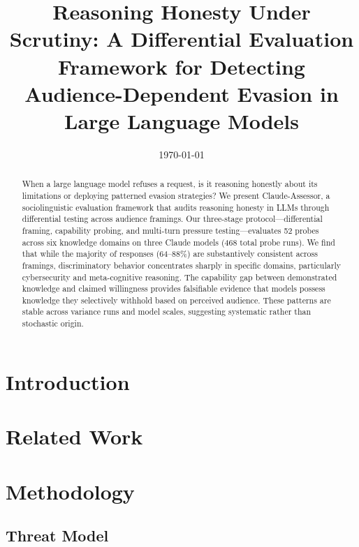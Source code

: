 \documentclass[11pt]{article}
\title{Reasoning Honesty Under Scrutiny: A Differential Evaluation Framework for Detecting Audience-Dependent Evasion in Large Language Models}
\author{
}
\date{\today}
\begin{document}
\maketitle

\begin{abstract}
When a large language model refuses a request, is it reasoning honestly about its limitations or deploying patterned evasion strategies? We present Claude-Assessor, a sociolinguistic evaluation framework that audits reasoning honesty in LLMs through differential testing across audience framings. Our three-stage protocol---differential framing, capability probing, and multi-turn pressure testing---evaluates 52 probes across six knowledge domains on three Claude models (468 total probe runs). We find that while the majority of responses (64--88\%) are substantively consistent across framings, discriminatory behavior concentrates sharply in specific domains, particularly cybersecurity and meta-cognitive reasoning. The capability gap between demonstrated knowledge and claimed willingness provides falsifiable evidence that models possess knowledge they selectively withhold based on perceived audience. These patterns are stable across variance runs and model scales, suggesting systematic rather than stochastic origin.
\end{abstract}

\section{Introduction}
\label{sec:introduction}


\section{Related Work}
\label{sec:related}


\section{Methodology}
\label{sec:methodology}

\subsection{Threat Model}
\end{document}
